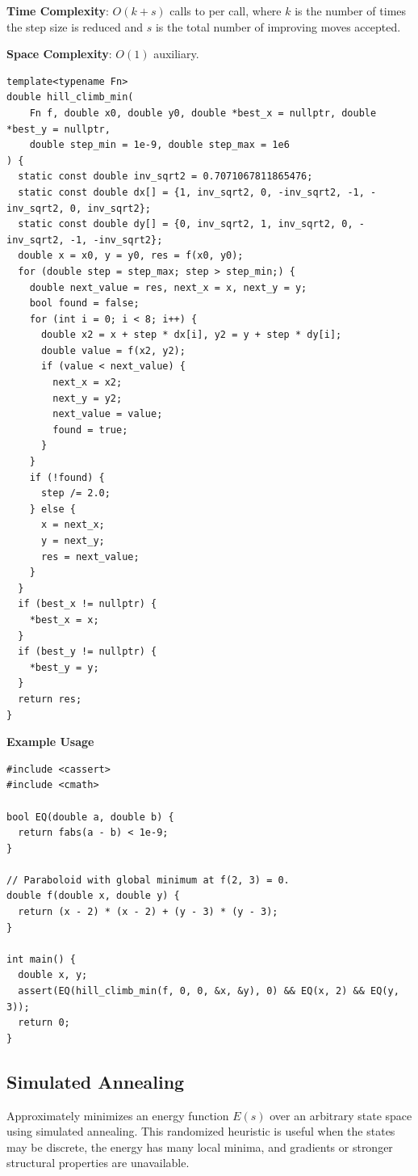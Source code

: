 \textbf{Time Complexity}: $O(k + s)$ calls to  per call, where $k$ is the number of times the step size is reduced and $s$ is the total number of improving moves accepted.

\textbf{Space Complexity}: $O(1)$ auxiliary.

\begin{lstlisting}[style=cpp]
template<typename Fn>
double hill_climb_min(
    Fn f, double x0, double y0, double *best_x = nullptr, double *best_y = nullptr,
    double step_min = 1e-9, double step_max = 1e6
) {
  static const double inv_sqrt2 = 0.7071067811865476;
  static const double dx[] = {1, inv_sqrt2, 0, -inv_sqrt2, -1, -inv_sqrt2, 0, inv_sqrt2};
  static const double dy[] = {0, inv_sqrt2, 1, inv_sqrt2, 0, -inv_sqrt2, -1, -inv_sqrt2};
  double x = x0, y = y0, res = f(x0, y0);
  for (double step = step_max; step > step_min;) {
    double next_value = res, next_x = x, next_y = y;
    bool found = false;
    for (int i = 0; i < 8; i++) {
      double x2 = x + step * dx[i], y2 = y + step * dy[i];
      double value = f(x2, y2);
      if (value < next_value) {
        next_x = x2;
        next_y = y2;
        next_value = value;
        found = true;
      }
    }
    if (!found) {
      step /= 2.0;
    } else {
      x = next_x;
      y = next_y;
      res = next_value;
    }
  }
  if (best_x != nullptr) {
    *best_x = x;
  }
  if (best_y != nullptr) {
    *best_y = y;
  }
  return res;
}
\end{lstlisting}
\textbf{Example Usage}\par
\begin{lstlisting}[style=cpp]
#include <cassert>
#include <cmath>

bool EQ(double a, double b) {
  return fabs(a - b) < 1e-9;
}

// Paraboloid with global minimum at f(2, 3) = 0.
double f(double x, double y) {
  return (x - 2) * (x - 2) + (y - 3) * (y - 3);
}

int main() {
  double x, y;
  assert(EQ(hill_climb_min(f, 0, 0, &x, &y), 0) && EQ(x, 2) && EQ(y, 3));
  return 0;
}
\end{lstlisting}
\subsection{Simulated Annealing}
\label{sec:5.2.3}
Approximately minimizes an energy function $E(s)$ over an arbitrary state space using simulated annealing. This randomized heuristic is useful when the states may be discrete, the energy has many local minima, and gradients or stronger structural properties are unavailable.


